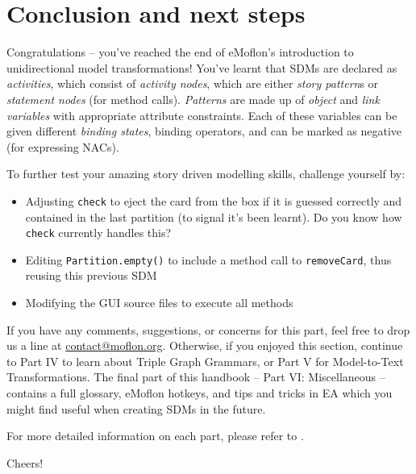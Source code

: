 \genHeader
\section{Conclusion and next steps}

\vspace{0.5cm}

Congratulations -- you've reached the end of eMoflon's introduction to unidirectional model transformations! You've learnt that SDMs are declared as
\emph{activities}, which consist of \emph{activity nodes}, which are either \emph{story pattern}s or \emph{statement nodes} (for method calls).
\emph{Patterns} are made up of \emph{object} and \emph{link variables} with appropriate attribute constraints. Each of these variables can be given
different \emph{binding states}, binding operators, and can be marked as negative (for expressing NACs).

\vspace{0.5cm}

To further test your amazing story driven modelling skills, challenge yourself by:
\begin{itemize}
\item Adjusting \texttt{check} to eject the card from the box if it is guessed correctly and contained in the last partition (to signal it's been learnt). Do
you know how \texttt{check} currently handles this?
\item Editing \texttt{Partition.empty()} to include a method call to \texttt{removeCard}, thus reusing this previous SDM
\item Modifying the GUI source files to execute all methods
\end{itemize}

\vspace{0.5cm}
	
If you have any comments, suggestions, or concerns for this part, feel free to drop us a line at \href{mailto:contact@moflon.org}{contact@moflon.org}.
Otherwise, if you enjoyed this section, continue to Part IV to learn about Triple Graph Grammars, or Part V for Model-to-Text Transformations.
The final part of this handbook -- Part VI: Miscellaneous -- contains a full glossary, eMoflon hotkeys, and tips and tricks in EA which you might find
useful when creating SDMs in the future.

For more detailed information on each part, please refer to .
\vspace{0.5cm}

Cheers!
